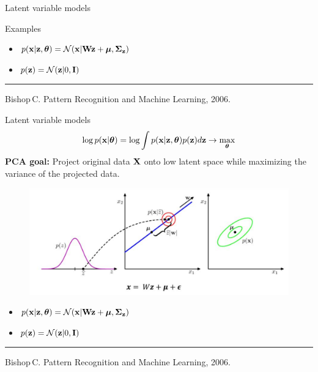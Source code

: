 \begin{frame}{Latent variable models}
\begin{block}{Examples}
\begin{minipage}[t]{0.53\columnwidth}
\begin{figure}
		\end{figure}
		\vspace{-0.5cm}
		\begin{itemize}
	        \item $p(\mathbf{x} | \mathbf{z}, \boldsymbol{\theta}) = \mathcal{N}(\mathbf{x} | \mathbf{W} \mathbf{z} + \boldsymbol{\mu}, \boldsymbol{\Sigma}_{\mathbf{z}})$
	        \item $p(\mathbf{z}) = \mathcal{N}(\mathbf{z} | 0, \mathbf{I})$
	    \end{itemize}
	\end{minipage}
	\end{block}

\vfill
\hrule\medskip
{\scriptsize Bishop\,C. Pattern Recognition and Machine Learning, 2006.}
    
\end{frame}
\begin{frame}{Latent variable models}
    \[
    \log p(\mathbf{x} | \boldsymbol{\theta}) = \log \int p(\mathbf{x} | \mathbf{z}, \boldsymbol{\theta}) p(\mathbf{z}) d\mathbf{z} \rightarrow \max_{\boldsymbol{\theta}}
    \]
	\textbf{PCA goal:} Project original data $\mathbf{X}$ onto low latent space while maximizing the variance of the projected data. 
	\begin{figure}
		\centering
		\includegraphics[width=.7\linewidth]{figs/bayesian_pca.png}
	\end{figure}
	\vspace{-0.5cm}
	\begin{itemize}
        \item $p(\mathbf{x} | \mathbf{z}, \boldsymbol{\theta}) = \mathcal{N}(\mathbf{x} | \mathbf{W} \mathbf{z} + \boldsymbol{\mu}, \boldsymbol{\Sigma}_{\mathbf{z}})$
        \item $p(\mathbf{z}) = \mathcal{N}(\mathbf{z} | 0, \mathbf{I})$
    \end{itemize}

\vfill
\hrule\medskip
{\scriptsize Bishop\,C. Pattern Recognition and Machine Learning, 2006.}
    
\end{frame}
